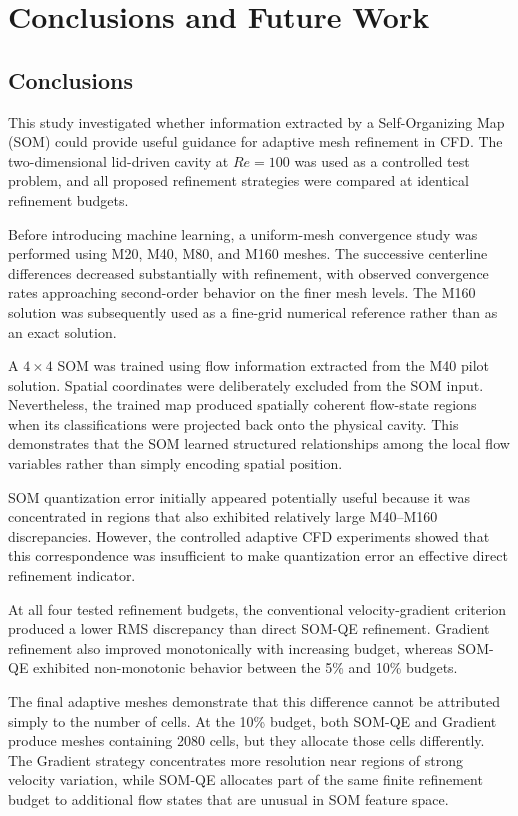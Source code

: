 \section{Conclusions and Future Work}
\label{sec:conclusions}

\subsection{Conclusions}

This study investigated whether information extracted by a
Self-Organizing Map (SOM) could provide useful guidance for adaptive
mesh refinement in CFD. The two-dimensional lid-driven cavity at
\(Re=100\) was used as a controlled test problem, and all proposed
refinement strategies were compared at identical refinement budgets.

Before introducing machine learning, a uniform-mesh convergence study
was performed using M20, M40, M80, and M160 meshes. The successive
centerline differences decreased substantially with refinement, with
observed convergence rates approaching second-order behavior on the
finer mesh levels. The M160 solution was subsequently used as a
fine-grid numerical reference rather than as an exact solution.

A \(4\times4\) SOM was trained using flow information extracted from the
M40 pilot solution. Spatial coordinates were deliberately excluded from
the SOM input. Nevertheless, the trained map produced spatially coherent
flow-state regions when its classifications were projected back onto the
physical cavity. This demonstrates that the SOM learned structured
relationships among the local flow variables rather than simply
encoding spatial position.

SOM quantization error initially appeared potentially useful because it
was concentrated in regions that also exhibited relatively large
M40--M160 discrepancies. However, the controlled adaptive CFD
experiments showed that this correspondence was insufficient to make
quantization error an effective direct refinement indicator.

At all four tested refinement budgets, the conventional velocity-gradient
criterion produced a lower RMS discrepancy than direct SOM-QE refinement.
Gradient refinement also improved monotonically with increasing budget,
whereas SOM-QE exhibited non-monotonic behavior between the 5\% and 10\%
budgets.

The final adaptive meshes demonstrate that this difference cannot be
attributed simply to the number of cells. At the 10\% budget, both
SOM-QE and Gradient produce meshes containing 2080 cells, but they
allocate those cells differently. The Gradient strategy concentrates
more resolution near regions of strong velocity variation, while SOM-QE
allocates part of the same finite refinement budget to additional flow
states that are unusual in SOM feature space.

